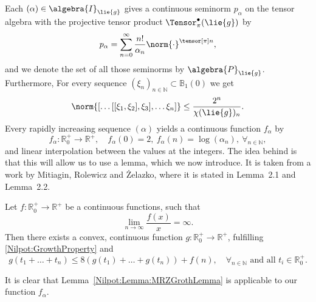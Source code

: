 Each $(\alpha) \in \algebra{I}_{\lie{g}}$ gives a continuous seminorm 
$p_{\alpha}$ on the tensor algebra with the projective tensor product 
$\Tensor_{\pi}^{\bullet}(\lie{g})$ by
\begin{equation*}
	p_{\alpha}
	=
	\sum\limits_{n = 0}^{\infty}
	\frac{n!}{\alpha_n}
	\norm{\cdot}^{\tensor[\pi] n},
\end{equation*}
and we denote the set of all those seminorms by $\algebra{P}_{\lie{g}}$. 
Furthermore, For every sequence $(\xi_n)_{n \in \mathbb{N}} \subset 
\mathbb{B}_1(0)$ we get
\begin{equation*}
	\norm{
		[ \ldots [[\xi_1, \xi_2], \xi_3], \ldots \xi_n]
	}
	\leq
	\frac{2^n}{\chi(\lie{g})_n}.
\end{equation*}
Every rapidly increasing sequence $(\alpha)$ yields a continuous function 
$f_{\alpha}$ by
\begin{equation}
	\label{Nilpot:IncreasingFunction}
	f_{\alpha}
	\colon
	\mathbb{R}_0^+
	\longrightarrow
	\mathbb{R}^+
	, \quad
	f_{\alpha}(0)
	=
	2
	,\
	f_{\alpha}(n)
	=
	\log \left( \alpha_n \right)
	,\
	\forall_{n \in \mathbb{N}},
\end{equation}
and linear interpolation between the values at the integers. The idea behind is 
that this will allow us to use a lemma, which we now introduce. It is taken 
from a work \cite{mitiagin.rolewicz.zelazko:1962a} by Mitiagin, Rolewicz and 
\.{Z}elazko, where it is stated in Lemma~2.1 and Lemma~2.2.
\begin{lemma}
	\label{Nilpot:Lemma:MRZGrothLemma}
	Let $f\colon \mathbb{R}_0^+ \longrightarrow \mathbb{R}^+$ be a continuous 
	functions, such that
	\begin{equation}
		\label{Nilpot:GrowthProperty}
		\lim_{n \longrightarrow \infty}
		\frac{f(x)}{x}
		=
		\infty.
	\end{equation}
	Then there exists a convex, continuous function $g \colon \mathbb{R}_0^+ 
	\longrightarrow \mathbb{R}^+$, fulfilling \eqref{Nilpot:GrowthProperty} and
	\begin{equation}
		\label{Nilpot:SplittingProperty}
		g \left(
			t_1 + \ldots + t_n
		\right)
		\leq
		8 \left(
			g \left( t_1 \right)
			+ \ldots +
			g \left( t_n \right)
		\right)
		+
		f(n)
		, \quad
		\forall_{n \in \mathbb{N}}
		\text{ and all }
		t_i \in \mathbb{R}_0^+.
	\end{equation}
\end{lemma}
It is clear that Lemma~\ref{Nilpot:Lemma:MRZGrothLemma} is applicable to our 
function $f_{\alpha}$. 


